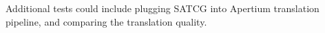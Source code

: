 \documentclass[11pt]{article}
\begin{document}
Additional tests could include plugging SATCG into Apertium
translation pipeline, and comparing the translation quality.

\end{document}
